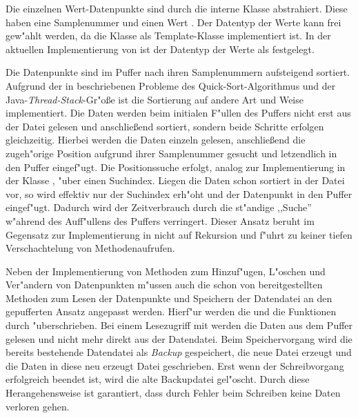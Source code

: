 Die einzelnen Wert-Datenpunkte sind durch die interne Klasse  abstrahiert.
Diese haben eine Samplenummer  und einen Wert .
Der Datentyp der Werte kann frei gew"ahlt werden, da die Klasse  als Template-Klasse implementiert ist.
In der aktuellen Implementierung von  ist der Datentyp der Werte als  festgelegt.

Die Datenpunkte sind im Puffer  nach ihren Samplenummern aufsteigend sortiert.
Aufgrund der in  beschriebenen Probleme des Quick-Sort-Algorithmus und der Java-\emph{Thread-Stack}-Gr"o{\ss}e ist die Sortierung auf andere Art und Weise implementiert.
Die Daten werden beim initialen F"ullen des Puffers nicht erst aus der Datei gelesen und anschlie{\ss}end sortiert, sondern beide Schritte erfolgen gleichzeitig.
Hierbei werden die Daten einzeln gelesen, anschlie{\ss}end die zugeh"orige Position aufgrund ihrer Samplenummer gesucht und letzendlich in den Puffer eingef"ugt.
Die Positionssuche erfolgt, analog zur Implementierung in der Klasse , "uber einen Suchindex.
Liegen die Daten schon sortiert in der Datei vor, so wird effektiv nur der Suchindex erh"oht und der Datenpunkt in den Puffer eingef"ugt.
Dadurch wird der Zeitverbrauch durch die st"andige ,,Suche'' w"ahrend des Auff"ullens des Puffers verringert.
Dieser Ansatz beruht im Gegensatz zur Implementierung in  nicht auf Rekursion und f"uhrt zu keiner tiefen Verschachtelung von Methodenaufrufen.

Neben der Implementierung von Methoden zum Hinzuf"ugen, L"oschen und Ver"andern von Datenpunkten m"ussen auch die schon von  bereitgestellten Methoden zum Lesen der Datenpunkte und Speichern der Datendatei an den gepufferten Ansatz angepasst werden.
Hierf"ur werden die  und die  Funktionen durch  "uberschrieben.
Bei einem Lesezugriff mit  werden die Daten aus dem Puffer gelesen und nicht mehr direkt aus der Datendatei.
Beim Speichervorgang wird die bereits bestehende Datendatei als \emph{Backup} gespeichert, die neue Datei erzeugt und die Daten in diese neu erzeugt Datei geschrieben.
Erst wenn der Schreibvorgang erfolgreich beendet ist, wird die alte Backupdatei gel"oscht.
Durch diese Herangehensweise ist garantiert, dass durch Fehler beim Schreiben keine Daten verloren gehen.


